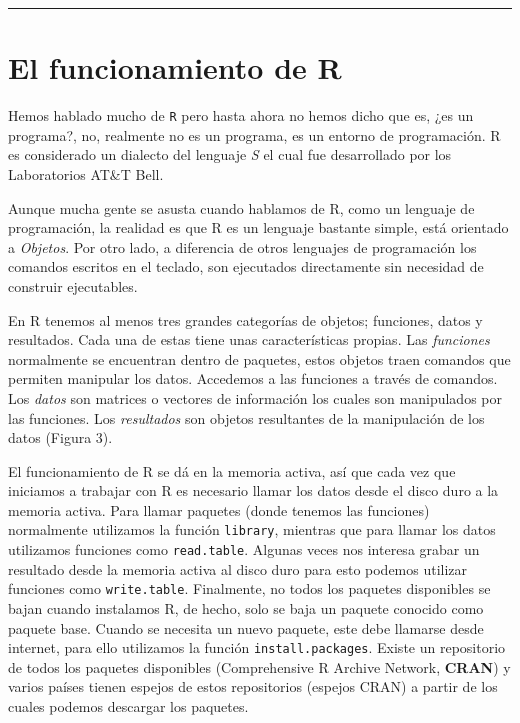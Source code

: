 \documentclass[]{article}
\begin{document}
\begin{center}\rule{0.5\linewidth}{\linethickness}\end{center}

\section{El funcionamiento de R}\label{el-funcionamiento-de-r}

Hemos hablado mucho de \texttt{R} pero hasta ahora no hemos dicho que
es, ¿es un programa?, no, realmente no es un programa, es un entorno de
programación. R es considerado un dialecto del lenguaje \emph{S} el cual
fue desarrollado por los Laboratorios AT\&T Bell.

Aunque mucha gente se asusta cuando hablamos de R, como un lenguaje de
programación, la realidad es que R es un lenguaje bastante simple, está
orientado a \emph{Objetos}. Por otro lado, a diferencia de otros
lenguajes de programación los comandos escritos en el teclado, son
ejecutados directamente sin necesidad de construir ejecutables.

En R tenemos al menos tres grandes categorías de objetos; funciones,
datos y resultados. Cada una de estas tiene unas características
propias. Las \emph{funciones} normalmente se encuentran dentro de
paquetes, estos objetos traen comandos que permiten manipular los datos.
Accedemos a las funciones a través de comandos. Los \emph{datos} son
matrices o vectores de información los cuales son manipulados por las
funciones. Los \emph{resultados} son objetos resultantes de la
manipulación de los datos (Figura 3).

El funcionamiento de R se dá en la memoria activa, así que cada vez que
iniciamos a trabajar con R es necesario llamar los datos desde el disco
duro a la memoria activa. Para llamar paquetes (donde tenemos las
funciones) normalmente utilizamos la función \texttt{library}, mientras
que para llamar los datos utilizamos funciones como \texttt{read.table}.
Algunas veces nos interesa grabar un resultado desde la memoria activa
al disco duro para esto podemos utilizar funciones como
\texttt{write.table}. Finalmente, no todos los paquetes disponibles se
bajan cuando instalamos R, de hecho, solo se baja un paquete conocido
como paquete base. Cuando se necesita un nuevo paquete, este debe
llamarse desde internet, para ello utilizamos la función
\texttt{install.packages}. Existe un repositorio de todos los paquetes
disponibles (Comprehensive R Archive Network, \textbf{CRAN}) y varios
países tienen espejos de estos repositorios (espejos CRAN) a partir de
los cuales podemos descargar los paquetes.
\end{document}
